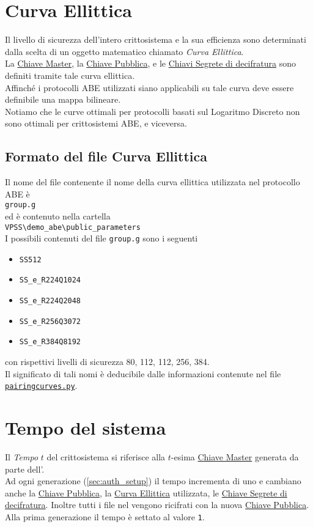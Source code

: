 \documentclass[a4paper,twoside,10pt,openany]{scrbook}
\begin{document}
\section{Curva Ellittica}\label{sec:ec}
Il livello di sicurezza dell'intero crittosistema e la sua efficienza sono determinati dalla scelta di un oggetto matematico chiamato \emph{Curva Ellittica}.\\
La \hyperref[sec:mk]{Chiave Master}, la \hyperref[sec:pk]{Chiave Pubblica}, e le \hyperref[sec:sk]{Chiavi Segrete di decifratura} sono definiti tramite tale curva ellittica.\\
Affinché i protocolli ABE utilizzati siano applicabili su tale curva deve essere definibile una mappa bilineare. \\
Notiamo che le curve ottimali per protocolli basati sul Logaritmo Discreto non sono ottimali per crittosistemi ABE, e viceversa.
%
\subsection{Formato del file Curva Ellittica}\label{sec:format_ec}
%
Il nome del file contenente il nome della curva ellittica utilizzata nel protocollo ABE è \\
\texttt{group.g}\\
ed è contenuto nella cartella\\
\texttt{VPSS\textbackslash demo\_abe\textbackslash public\_parameters}\\
I possibili contenuti del file \texttt{group.g} sono i seguenti
\begin{itemize}
 \item \texttt{SS512}
 \item \texttt{SS\_e\_R224Q1024}
 \item \texttt{SS\_e\_R224Q2048}
 \item \texttt{SS\_e\_R256Q3072}
 \item \texttt{SS\_e\_R384Q8192}
\end{itemize}
con rispettivi livelli di sicurezza 80, 112, 112, 256, 384.\\
Il significato di tali nomi è deducibile dalle informazioni contenute nel file \texttt{\hyperref[sec:file_curve]{pairingcurves.py}}.
%
\section{Tempo del sistema}\label{sec:time}
Il \emph{Tempo} $t$ del crittosistema si riferisce alla $t$-esima \hyperref[sec:mk]{Chiave Master} generata da parte dell'\auth. \\
Ad ogni generazione (\ref{sec:auth_setup}) il tempo incrementa di uno e cambiano anche la \hyperref[sec:pk]{Chiave Pubblica}, la \hyperref[sec:ec]{Curva Ellittica} utilizzata, le \hyperref[sec:sk]{Chiave Segrete di decifratura}. Inoltre tutti i file nel \sa vengono ricifrati con la nuova \hyperref[sec:pk]{Chiave Pubblica}.\\
Alla prima generazione il tempo è settato al valore \texttt{1}.
%
\end{document}
